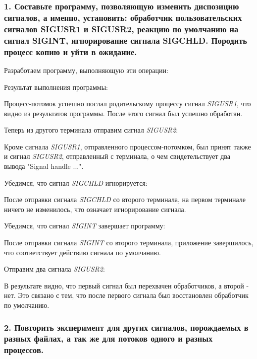 \documentclass[14pt,a4paper,report]{report}
\begin{document}
\subsubsection{1.  Составьте программу, позволяющую изменить диспозицию сигналов, а именно, установить: обработчик пользовательских сигналов SIGUSR1 и SIGUSR2, реакцию по умолчанию на сигнал SIGINT, игнорирование сигнала SIGCHLD. Породить процесс копию и уйти в ожидание.}

Разработаем программу, выполняющую эти операции:



Результат выполнения программы:



Процесс-потомок успешно послал родительскому процессу сигнал \emph{SIGUSR1}, что видно из результатов программы. После этого сигнал был успешно обработан.

Теперь из другого терминала отправим сигнал \emph{SIGUSR2}:



Кроме сигнала \emph{SIGUSR1}, отправленного процессом-потомком, был принят также и сигнал \emph{SIGUSR2}, отправленный с терминала, о чем свидетельствует два вывода "Signal handle ...".

Убедимся, что сигнал \emph{SIGCHLD} игнорируется:



После отправки сигнала \emph{SIGCHLD} со второго терминала, на первом терминале ничего не изменилось, что означает игнорирование сигнала.

Убедимся, что сигнал \emph{SIGINT} завершает программу:



После отправки сигнала \emph{SIGINT} со второго терминала, приложение завершилось, что соответствует действию сигнала по умолчанию.

Отправим два сигнала \emph{SIGUSR2}:



В результате видно, что первый сигнал был перехвачен обработчиков, а второй - нет. Это связано с тем, что после первого сигнала был восстановлен обработчик по умолчанию. 

\subsubsection{2.  Повторить эксперимент для других сигналов, порождаемых в разных файлах, а так же для потоков одного и разных процессов.}
\end{document}

